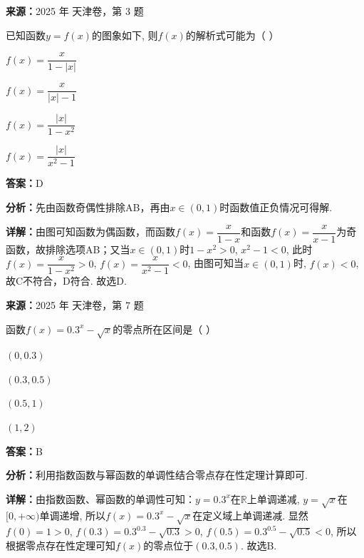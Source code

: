 \begin{question}[points=5]
\textbf{来源：}2025 年 天津卷，第 3 题\par
已知函数$y = f(x)$的图象如下, 则$f(x)$的解析式可能为（   ）
\begin{choices}
  \item $f(x) = \dfrac{x}{1 - |x|}$
  \item $f(x) = \dfrac{x}{|x| - 1}$
  \item $f(x) = \dfrac{|x|}{1 - x^2}$
  \item $f(x) = \dfrac{|x|}{x^2 - 1}$
\end{choices}
\begin{solution}
\textbf{答案：}D

\textbf{分析：}先由函数奇偶性排除AB，再由$x \in (0,1)$时函数值正负情况可得解.

\textbf{详解：}由图可知函数为偶函数，而函数$f(x) = \dfrac{x}{1-x}$和函数$f(x) = \dfrac{x}{x-1}$为奇函数，故排除选项AB；又当$x \in (0,1)$时$1 - x^2 > 0$, $x^2 - 1 < 0$, 此时$f(x) = \dfrac{x}{1-x^2} > 0$, $f(x) = \dfrac{x}{x^2-1} < 0$, 由图可知当$x \in (0,1)$时, $f(x) < 0$, 故C不符合，D符合. 故选D.
\end{solution}
\end{question}

\begin{question}[points=5]
\textbf{来源：}2025 年 天津卷，第 7 题\par
函数$f(x) = 0.3^x - \sqrt{x}$的零点所在区间是（   ）
\begin{choices}
  \item $(0, 0.3)$
  \item $(0.3, 0.5)$
  \item $(0.5, 1)$
  \item $(1, 2)$
\end{choices}
\begin{solution}
\textbf{答案：}B

\textbf{分析：}利用指数函数与幂函数的单调性结合零点存在性定理计算即可.

\textbf{详解：}由指数函数、幂函数的单调性可知：$y = 0.3^x$在$\mathbb{R}$上单调递减, $y = \sqrt{x}$在$[0, +\infty)$单调递增, 所以$f(x) = 0.3^x - \sqrt{x}$在定义域上单调递减. 显然$f(0) = 1 > 0$, $f(0.3) = 0.3^{0.3} - \sqrt{0.3} > 0$, $f(0.5) = 0.3^{0.5} - \sqrt{0.5} < 0$, 所以根据零点存在性定理可知$f(x)$的零点位于$(0.3, 0.5)$. 故选B.
\end{solution}
\end{question}

